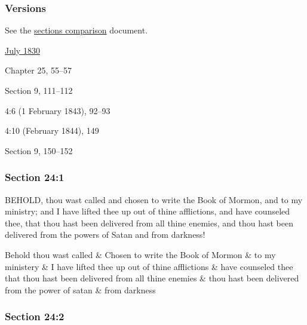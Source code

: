 	\subsubsection{Versions}
		\label{DC24-V}
		
		See the \href{https://drive.google.com/file/d/1goAvNz8jS4R8slYfMG_db55Ty2z_vmgK/view?usp=sharing}{sections comparison} document.
	
		\begin{compactdesc}
			\item[JSP] \hyperref[EMS-1830-JS-JUL-1830-A]{July 1830}
			\item[BC] Chapter 25, 55--57
			\item[DC 1835] Section 9, 111--112
			\item[TS] 4:6 (1 February 1843), 92--93
			\item[MS] 4:10 (February 1844), 149
			\item[DC 1844] Section 9, 150--152
		\end{compactdesc}

	\subsubsection{Section 24:1} %
		\label{DC24-1}

		BEHOLD, thou wast called and chosen to write the Book of Mormon, and to my ministry; and I have lifted thee up out of thine afflictions, and have counseled thee, that thou hast been delivered from all thine enemies, and thou hast been delivered from the powers of Satan and from darkness!

		\begin{framed}
		\scriptsize
			\begin{compactdesc}
				\item[JSP] Behold thou wast called \& Chosen to write the Book of Mormon \& to my ministery \& I have lifted thee up out of thine afflictions \& have counseled thee that thou hast been delivered from all thine enemies \& thou hast been delivered from the power of satan \& from darkness
			\end{compactdesc}
		\end{framed}

	\subsubsection{Section 24:2} %
		\label{DC24-2}

